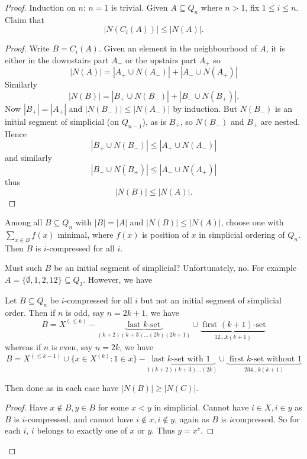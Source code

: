 \documentclass[a4paper]{article}
\begin{document}
\begin{proof}
  Induction on \(n\): \(n = 1\) is trivial. Given \(A \subseteq Q_n\) where \(n > 1\), fix \(1 \leq i \leq n\). Claim that
  \[
    |N(C_i(A))| \leq |N(A)|.
  \]
  \begin{proof}
    Write \(B = C_i(A)\). Given an element in the neighbourhood of \(A\), it is either in the downstairs part \(A_-\) or the upstairs part \(A_+\) so
    \[
      |N(A)| = |A_+ \cup N(A_-)| + |A_- \cup N(A_+)|
    \]
    Similarly
    \[
      |N(B)| = |B_+ \cup N(B_-)| + |B_- \cup N(B_+)|.
    \]
    Now \(|B_+| = |A_+|\) and \(|N(B_-)| \leq |N(A_-)|\) by induction. But \(N(B_-)\)  is an initial segment of simplicial (on \(Q_{n - 1}\)), as is \(B_+\), so \(N(B_-)\) and \(B_+\) are nested. Hence
    \[
      |B_+ \cup N(B_-)| \leq |A_+ \cup N(A_-)|
    \]
    and similarly
    \[
      |B_- \cup N(B_+)| \leq |A_- \cup N(A_+)|
    \]
    thus
    \[
      |N(B)| \leq |N(A)|.
    \]
  \end{proof}

  Among all \(B \subseteq Q_n\) with \(|B| = |A|\) and \(|N(B)| \leq |N(A)|\), choose one with \(\sum_{x \in B} f(x)\) minimal, where \(f(x)\) is position of \(x\) in simplicial ordering of \(Q_n\). Then \(B\) is \(i\)-compressed for all \(i\).

  Must such \(B\) be an initial segment of simplicial? Unfortunately, no. For example \(A = \{\emptyset, 1, 2, 12\} \subseteq Q_3\). However, we have

  \begin{lemma}
    Let \(B \subseteq Q_n\) be \(i\)-compressed for all \(i\) but not an initial segment of simplicial order. Then if \(n\) is odd, say \(n = 2k + 1\), we have
    \[
      B = X^{(\leq k)} - \underbrace{\text{ last \(k\)-set }}_{(k + 2)(k + 3) \dots (2k)(2k + 1)} \cup \underbrace{\text{ first \((k + 1)\)-set}}_{12\dots k(k + 1)}
    \]
    whereas if \(n\) is even, say \(n = 2k\), we have
    \[
      B = X^{(\leq k - 1)} \cup \{x \in X^{(k)}: 1 \in x\} - \underbrace{\text{ last \(k\)-set with \(1\) }}_{1(k + 2)(k + 3) \dots (2k)} \cup \underbrace{\text{ first \(k\)-set without \(1\)}}_{234\dots k (k + 1)}
    \] 
  \end{lemma}
  Then done as in each case have \(|N(B)| \geq |N(C)|\).

  \begin{proof}
    Have \(x \notin B, y \in B\) for some \(x < y\) in simplicial. Cannot have \(i \in X, i \in y\) as \(B\) is \(i\)-compressed, and cannot have \(i \notin x, i \notin y\), again as \(B\) is \(i\)compressed. So for each \(i\), \(i\) belongs to exactly one of \(x\) or \(y\). Thus \(y = x^c\).


\end{proof}
\end{proof}
\end{document}
